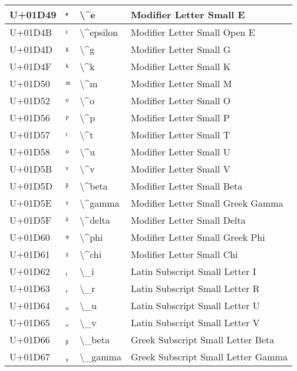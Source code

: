 \begin{table}[h]
\begin{tabulary}{\linewidth}{|L|L|L|L|}
\hline
U+01D49 & ᵉ & {\textbackslash}{\textasciicircum}e & Modifier Letter Small E \\
\hline
U+01D4B & ᵋ & {\textbackslash}{\textasciicircum}epsilon & Modifier Letter Small Open E \\
\hline
U+01D4D & ᵍ & {\textbackslash}{\textasciicircum}g & Modifier Letter Small G \\
\hline
U+01D4F & ᵏ & {\textbackslash}{\textasciicircum}k & Modifier Letter Small K \\
\hline
U+01D50 & ᵐ & {\textbackslash}{\textasciicircum}m & Modifier Letter Small M \\
\hline
U+01D52 & ᵒ & {\textbackslash}{\textasciicircum}o & Modifier Letter Small O \\
\hline
U+01D56 & ᵖ & {\textbackslash}{\textasciicircum}p & Modifier Letter Small P \\
\hline
U+01D57 & ᵗ & {\textbackslash}{\textasciicircum}t & Modifier Letter Small T \\
\hline
U+01D58 & ᵘ & {\textbackslash}{\textasciicircum}u & Modifier Letter Small U \\
\hline
U+01D5B & ᵛ & {\textbackslash}{\textasciicircum}v & Modifier Letter Small V \\
\hline
U+01D5D & ᵝ & {\textbackslash}{\textasciicircum}beta & Modifier Letter Small Beta \\
\hline
U+01D5E & ᵞ & {\textbackslash}{\textasciicircum}gamma & Modifier Letter Small Greek Gamma \\
\hline
U+01D5F & ᵟ & {\textbackslash}{\textasciicircum}delta & Modifier Letter Small Delta \\
\hline
U+01D60 & ᵠ & {\textbackslash}{\textasciicircum}phi & Modifier Letter Small Greek Phi \\
\hline
U+01D61 & ᵡ & {\textbackslash}{\textasciicircum}chi & Modifier Letter Small Chi \\
\hline
U+01D62 & ᵢ & {\textbackslash}\_i & Latin Subscript Small Letter I \\
\hline
U+01D63 & ᵣ & {\textbackslash}\_r & Latin Subscript Small Letter R \\
\hline
U+01D64 & ᵤ & {\textbackslash}\_u & Latin Subscript Small Letter U \\
\hline
U+01D65 & ᵥ & {\textbackslash}\_v & Latin Subscript Small Letter V \\
\hline
U+01D66 & ᵦ & {\textbackslash}\_beta & Greek Subscript Small Letter Beta \\
\hline
U+01D67 & ᵧ & {\textbackslash}\_gamma & Greek Subscript Small Letter Gamma \\

\end{tabulary}
\end{table}
